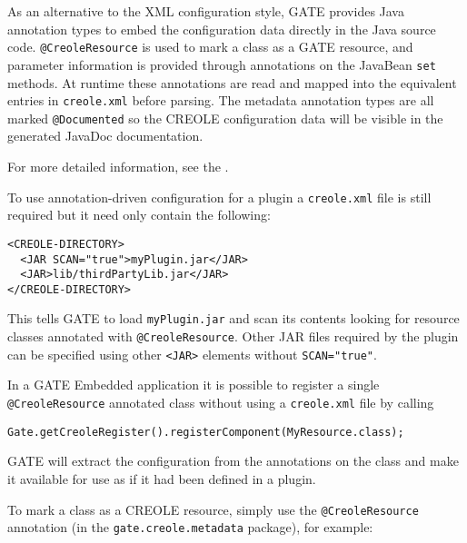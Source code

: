 As an alternative to the XML configuration style, GATE provides Java
annotation types to embed the configuration data directly in the Java source
code.  \verb|@CreoleResource| is used to mark a class as a GATE resource, and
parameter information is provided through annotations on the JavaBean {\tt set}
methods.  At runtime these annotations are read and mapped into the equivalent
entries in {\tt creole.xml} before parsing.  The metadata annotation types are
all marked \verb|@Documented| so the CREOLE configuration data will be visible
in the generated JavaDoc documentation.

For more detailed information, see the
.

To use annotation-driven configuration for a plugin a {\tt creole.xml} file is
still required but it need only contain the following:
\begin{small}\begin{verbatim}
<CREOLE-DIRECTORY>
  <JAR SCAN="true">myPlugin.jar</JAR>
  <JAR>lib/thirdPartyLib.jar</JAR>
</CREOLE-DIRECTORY>
\end{verbatim}\end{small}

This tells GATE to load {\tt myPlugin.jar} and scan its contents looking for
resource classes annotated with \verb|@CreoleResource|.  Other JAR files
required by the plugin can be specified using other \verb|<JAR>| elements
without \verb|SCAN="true"|.

In a GATE Embedded application it is possible to register a single
\verb|@CreoleResource| annotated class without using a {\tt creole.xml} file
by calling
\begin{small}\begin{verbatim}
Gate.getCreoleRegister().registerComponent(MyResource.class);
\end{verbatim}\end{small}
%
GATE will extract the configuration from the annotations on the class and make
it available for use as if it had been defined in a plugin.


To mark a class as a CREOLE resource, simply use the \verb|@CreoleResource|
annotation (in the {\tt gate.creole.metadata} package), for example:

